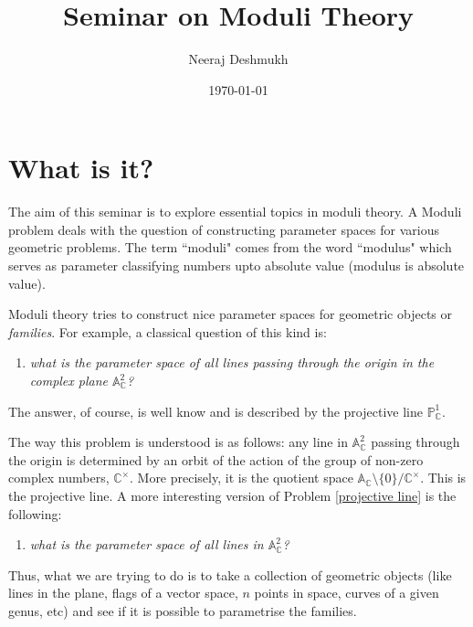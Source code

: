 \documentclass[11pt]{amsart}
\makeatletter
\def\subtitle#1{\gdef\@subtitle{#1}}
\def\@subtitle{}
\newcommand{\A}{{\mathbb A}}
\newcommand{\C}{{\mathbb C}}
\renewcommand{\P}{{\mathbb P}}
\theoremstyle{definition}
\makeatother
\begin{document}
\title{Seminar on Moduli Theory}
\subtitle{What to expect}
\author{Neeraj Deshmukh}
\date{\today}

\maketitle

\section{What is it?}
The aim of this seminar is to explore essential topics in moduli theory. A Moduli problem deals with the question of constructing parameter spaces for various geometric problems. The term ``moduli" comes from the word ``modulus" which serves as parameter classifying numbers upto absolute value (modulus is absolute value).

Moduli theory tries to construct nice parameter spaces for geometric objects or \textit{families}. For example, a classical question of this kind is: 
\begin{enumerate}[leftmargin=2\parindent]\label{projective line}
\item \textit{what is the parameter space of all lines  passing through the origin in the complex plane $\A_{\C}^2$?}
\end{enumerate}

The answer, of course, is well know and is described by the projective line $\P_{\C}^1$.

The way this problem is understood is as follows: any line in $\A_{\C}^2$ passing through the origin is determined by an orbit of the action of the group of non-zero complex numbers, $\C^{\times}$. More precisely, it is the quotient space $\A_{\C}\setminus \lbrace 0 \rbrace/\C^{\times}$. This is the projective line. A more interesting version of Problem \ref{projective line} is the following:

\begin{enumerate}[resume, leftmargin=2\parindent]
	\item \textit{what is the parameter space of all lines in $\A_{\C}^2$?}
\end{enumerate}

Thus, what we are trying to do is to take a collection of geometric objects (like lines in the plane, flags of a vector space, $n$ points in space, curves of a given genus, etc) and see if it is possible to parametrise the families.
\end{document}
